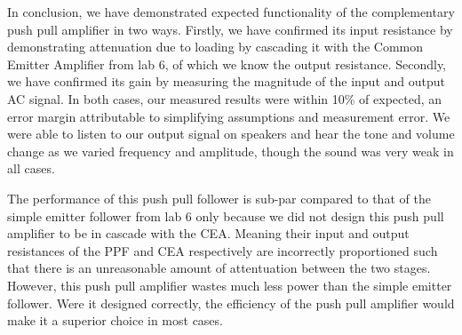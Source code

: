 \documentclass[12pt,letterpaper]{report}
\begin{document}
In conclusion, we have demonstrated expected functionality of the complementary push pull amplifier in two ways. Firstly, we have confirmed its input resistance by demonstrating attenuation due to loading by cascading it with the Common Emitter Amplifier from lab 6, of which we know the output resistance. Secondly, we have confirmed its gain by measuring the magnitude of the input and output AC signal. In both cases, our measured results were within 10\% of expected, an error margin attributable to simplifying assumptions and measurement error. We were able to listen to our output signal on speakers and hear the tone and volume change as we varied frequency and amplitude, though the sound was very weak in all cases.

The performance of this push pull follower is sub-par compared to that of the simple emitter follower from lab 6 only because we did not design this push pull amplifier to be in cascade with the CEA. Meaning their input and output resistances of the PPF and CEA respectively are incorrectly proportioned such that there is an unreasonable amount of attentuation between the two stages. However, this push pull amplifier wastes much less power than the simple emitter follower. Were it designed correctly, the efficiency of the push pull amplifier would make it a superior choice in most cases.
\end{document}
